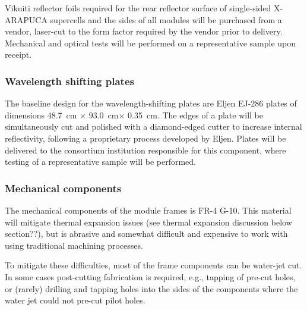 Vikuiti reflector foils required for the rear reflector surface of single-sided X-ARAPUCA supercells and the sides of all modules will be purchased from a vendor, laser-cut to the form factor required by the vendor prior to delivery.  Mechanical and optical  tests will be performed on a representative sample upon receipt.

\subsubsection{Wavelength shifting plates}

The baseline design for the wavelength-shifting plates are %
Eljen EJ-286 plates of dimensions \SI{48.7}{cm} $\times$ \SI{93.0}{cm}$\times$ \SI{0.35}{cm}.  The edges of a plate will be simultaneously cut and polished with a diamond-edged cutter to increase internal reflectivity, following a proprietary process developed by Eljen.  Plates will be delivered to the consortium institution responsible for this component, where  testing of a representative sample will be performed.

\subsubsection{Mechanical components}

The mechanical components of the  module frames is
FR-4 G-10. This material will mitigate thermal expansion issues (see thermal expansion discussion below section??), %
but is abrasive and somewhat difficult and expensive to work with using traditional machining processes.

To mitigate these difficulties, most of the  frame components can be water-jet cut. %
In some cases post-cutting fabrication is required, e.g., tapping of pre-cut holes, or (rarely) drilling and tapping holes into the sides of the components where the water jet could not pre-cut pilot holes.

